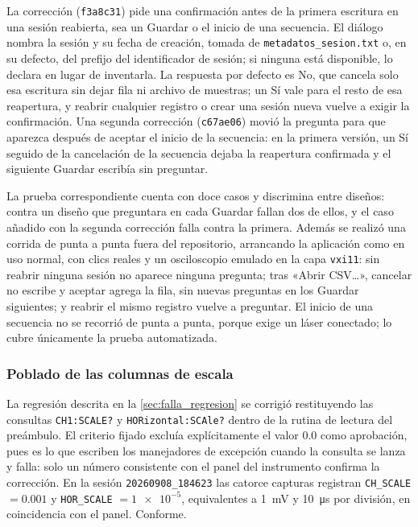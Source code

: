 La corrección (\texttt{f3a8c31}) pide una confirmación antes de la
primera escritura en una sesión reabierta, sea un Guardar o el inicio
de una secuencia. El diálogo nombra la sesión y su fecha de creación,
tomada de \texttt{metadatos\_sesion.txt} o, en su defecto, del prefijo
del identificador de sesión; si ninguna está disponible, lo declara en
lugar de inventarla. La respuesta por defecto es No, que cancela solo
esa escritura sin dejar fila ni archivo de muestras; un Sí vale para
el resto de esa reapertura, y reabrir cualquier registro o crear una
sesión nueva vuelve a exigir la confirmación. Una segunda corrección
(\texttt{c67ae06}) movió la pregunta para que aparezca después de
aceptar el inicio de la secuencia: en la primera versión, un Sí seguido
de la cancelación de la secuencia dejaba la reapertura confirmada y el
siguiente Guardar escribía sin preguntar.

La prueba correspondiente cuenta con doce casos y discrimina entre
diseños: contra un diseño que preguntara en cada Guardar fallan dos de
ellos, y el caso añadido con la segunda corrección falla contra la
primera. Además se realizó una corrida de punta a punta fuera del
repositorio, arrancando la aplicación como en uso normal, con clics
reales y un osciloscopio emulado en la capa \texttt{vxi11}: sin
reabrir ninguna sesión no aparece ninguna pregunta; tras «Abrir
CSV…», cancelar no escribe y aceptar agrega la fila, sin nuevas
preguntas en los Guardar siguientes; y reabrir el mismo registro
vuelve a preguntar. El inicio de una secuencia no se recorrió de punta
a punta, porque exige un láser conectado; lo cubre únicamente la
prueba automatizada.


\subsubsection*{Poblado de las columnas de escala}

La regresión descrita en la \cref{sec:falla_regresion} se corrigió
restituyendo las consultas \texttt{CH1:SCALE?} y
\texttt{HORizontal:SCAle?} dentro de la rutina de lectura del
preámbulo. El criterio fijado excluía explícitamente el valor
\num{0.0} como aprobación, pues es lo que escriben los manejadores de
excepción cuando la consulta se lanza y falla: solo un número
consistente con el panel del instrumento confirma la corrección. En la
sesión \texttt{20260908\_184623} las catorce capturas registran
\texttt{CH\_SCALE} $=\num{0.001}$ y \texttt{HOR\_SCALE} $=\num{1e-5}$,
equivalentes a \SI{1}{\milli\volt} y \SI{10}{\micro\second} por
división, en coincidencia con el panel. Conforme.

